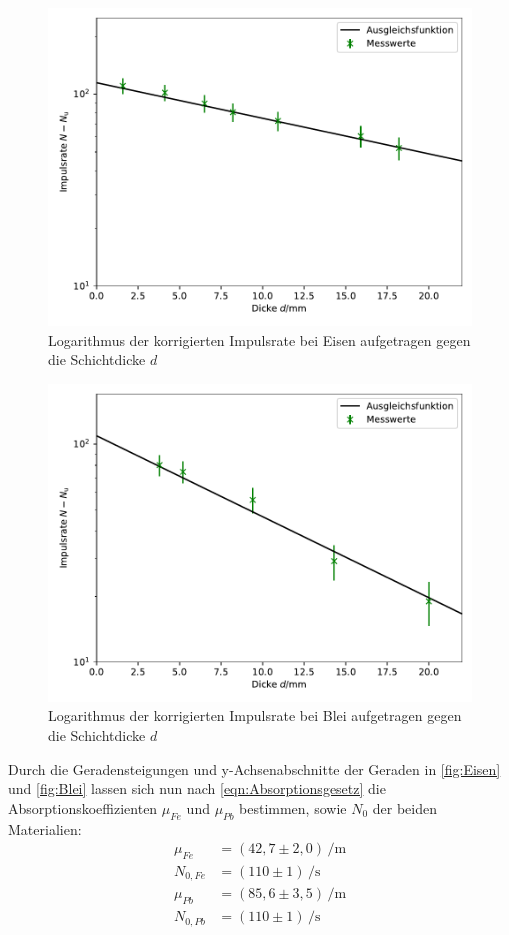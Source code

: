 \begin{figure}
  \centering
  \includegraphics{Bilder/Eisen.pdf}
  \caption{Logarithmus der korrigierten Impulsrate bei Eisen aufgetragen gegen die Schichtdicke $d$}
  \label{fig:Eisen}
\end{figure}
\begin{figure}
  \centering
  \includegraphics{Bilder/Blei.pdf}
  \caption{Logarithmus der korrigierten Impulsrate bei Blei aufgetragen gegen die Schichtdicke $d$}
  \label{fig:Blei}
\end{figure}

Durch die Geradensteigungen und y-Achsenabschnitte der Geraden in \autoref{fig:Eisen} und \autoref{fig:Blei} 
lassen sich nun nach \autoref{eqn:Absorptionsgesetz} die Absorptionskoeffizienten $\mu_{Fe}$ und $\mu_{Pb}$ 
bestimmen, sowie $N_0$ der beiden Materialien:\\
\begin{align*}
  \mu_{Fe} &= (42,7 \pm 2,0) \, \si{\per\meter} \\
  N_{0,Fe} &= (110 \pm 1) \, \si{\per\second} \\
  \mu_{Pb} &= (85,6 \pm 3,5) \, \si{\per\meter} \\
  N_{0,Pb} &= (110 \pm 1) \, \si{\per\second} \\
\end{align*}

